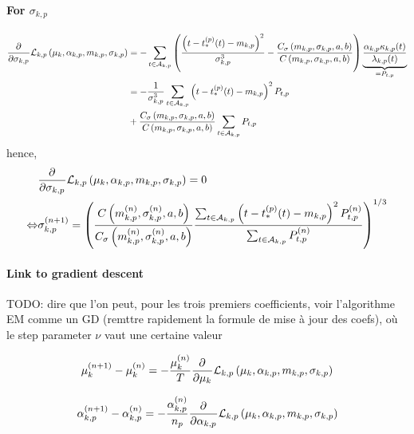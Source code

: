 \paragraph{For $\sigma_{k,p}$}
\begin{equation}
\begin{split}
    \frac{\partial^{}}{\partial {\sigma_{k,p}}^{}}\mathcal{L}_{k,p}\left( \mu_k, \alpha_{k,p}, m_{k,p}, \sigma_{k,p} \right) &= -\sum_{t\in\mathcal{A}_{k,p}} \left( \frac{\left( t - t_*^{(p)}(t) - m_{k,p} \right)^2}{\sigma_{k,p}^3} - \frac{C_\sigma\left( m_{k,p}, \sigma_{k,p},a,b \right)}{C\left( m_{k,p}, \sigma_{k,p},a,b \right)} \right)\underbrace{\frac{\alpha_{k,p}\kappa_{k,p}(t)}{\lambda_{k,p}(t)}}_{=P_{t,p}} \\
    &= -\frac{1}{\sigma_{k,p}^3} \sum_{t\in\mathcal{A}_{k,p}} \left( t - t_*^{(p)}(t) - m_{k,p} \right)^2 P_{t,p} \\
    &+  \frac{C_\sigma\left( m_{k,p}, \sigma_{k,p},a,b \right)}{C\left( m_{k,p}, \sigma_{k,p},a,b \right)} \sum_{t\in\mathcal{A}_{k,p}} P_{t,p}
\end{split}
\end{equation}
hence,
\begin{equation}
\begin{split}
    &\frac{\partial^{}}{\partial {\sigma_{k,p}}^{}}\mathcal{L}_{k,p}\left( \mu_k, \alpha_{k,p}, m_{k,p}, \sigma_{k,p} \right) = 0 \\
    \Leftrightarrow &\sigma_{k,p}^{(n+1)} = \left( \frac{C\left( m_{k,p}^{(n)}, \sigma_{k,p}^{(n)},a,b \right)}{C_\sigma\left( m_{k,p}^{(n)}, \sigma_{k,p}^{(n)},a,b \right)} \frac{\sum_{t\in\mathcal{A}_{k,p}} \left( t - t_*^{(p)}(t) - m_{k,p} \right)^2 P_{t,p}^{(n)}}{\sum_{t\in\mathcal{A}_{k,p}}  P_{t,p}^{(n)}} \right)^{1/3}
\end{split}
\end{equation}

\paragraph{Link to gradient descent}
TODO: dire que l'on peut, pour les trois premiers coefficients, voir l'algorithme EM comme un GD (remttre rapidement la formule de mise à jour des coefs), où le step parameter $\nu$ vaut une certaine valeur

\begin{equation}
    \mu_k^{(n+1)} - \mu_k^{(n)} = -\frac{\mu_k^{(n)}}{T} \frac{\partial^{}}{\partial {\mu_k}^{}}\mathcal{L}_{k,p}\left( \mu_k, \alpha_{k,p}, m_{k,p}, \sigma_{k,p} \right)
\end{equation}

\begin{equation}
    \alpha_{k,p}^{(n+1)} - \alpha_{k,p}^{(n)} = -\frac{\alpha_{k,p}^{(n)}}{n_p} \frac{\partial^{}}{\partial {\alpha_{k,p}}^{}}\mathcal{L}_{k,p}\left( \mu_k, \alpha_{k,p}, m_{k,p}, \sigma_{k,p} \right)
\end{equation}

